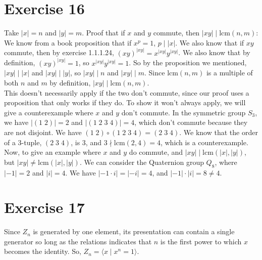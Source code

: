 \documentclass{article}
\newcommand{\lcm}{\text{lcm}}
\begin{document}
    \section*{Exercise 16}
    Take $|x| = n$ and $|y| = m$.
    Proof that if $x$ and $y$ commute,
    then $|xy| \mid \lcm(n, m)$: \\
    We know from a book proposition that if $x^p = 1$, $p \mid |x|$.
    We also know that if $xy$ commute,
    then by exercise 1.1.1.24, $(xy)^{|xy|} = x^{|xy|}y^{|xy|}$.
    We also know that by definition, $(xy)^{|xy|} = 1$,
    so $x^{|xy|}y^{|xy|} = 1$.
    So by the proposition we mentioned,
    $|xy| \mid |x|$ and $|xy| \mid |y|$,
    so $|xy| \mid n$ and $|xy| \mid m$.
    Since $\lcm(n, m)$ is a multiple of both $n$ and $m$ by definition,
    $|xy| \mid \lcm(n, m)$. \\
    This doesn't necessarily apply if the two don't commute,
    since our proof uses a proposition that only works if they do.
    To show it won't always apply, we will give a counterexample
    where $x$ and $y$ don't commute.
    In the symmetric group $S_3$,
    we have $|(1\;2)| = 2$ and $|(1\;2\;3\;4)| = 4$,
    which don't commute because they are not disjoint.
    We have $(1\;2) \circ (1\;2\;3\;4) = (2\;3\;4)$.
    We know that the order of a 3-tuple, $(2\;3\;4)$, is 3, 
    and $3 \nmid \lcm(2, 4) = 4$, 
    which is a counterexample. \\
    Now, to give an example where $x$ and $y$ do commute,
    and $|xy| \mid \lcm(|x|, |y|)$, but $|xy| \neq \lcm(|x|, |y|)$.
    We can consider the Quaternion group $Q_8$,
    where $|-1| = 2$ and $|i| = 4$.
    We have $|-1 \cdot i| = |-i| = 4$,
    and $|-1| \cdot |i| = 8 \neq 4$.


    \section*{Exercise 17}
    Since $Z_n$ is generated by one element,
    its presentation can contain a single generator
    so long as the relations indicates that $n$ is the first power
    to which $x$ becomes the identity.
    So, $Z_n = \langle x \mid x^n = 1 \rangle$.
\end{document}
